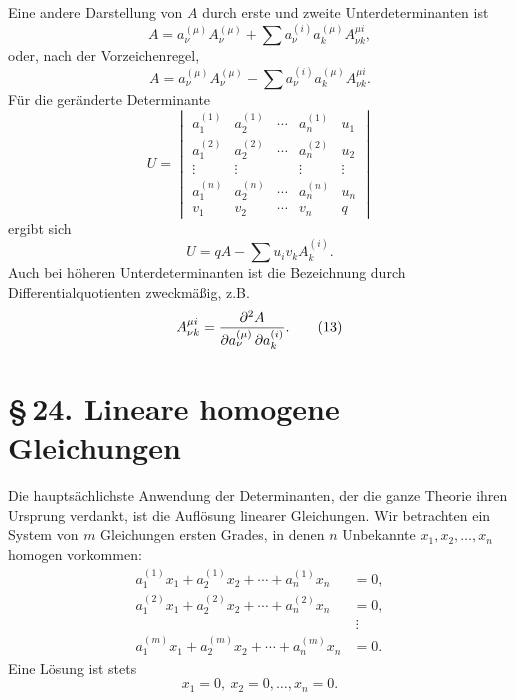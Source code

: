 \documentclass[11pt]{article}
\begin{document}
Eine andere Darstellung von \(A\) durch erste und zweite Unterdeterminanten ist
\begin{equation}
        A=a_\nu^{(\mu)}A_\nu^{(\mu)}+
        \sum a_\nu^{(i)}a_k^{(\mu)}A_{\nu k}^{\mu i},
\tag{9}
\end{equation}
oder, nach der Vorzeichenregel,
\begin{equation}
        A=a_\nu^{(\mu)}A_\nu^{(\mu)}-
        \sum a_\nu^{(i)}a_k^{(\mu)}A_{\nu k}^{\mu i}.
\tag{10}
\end{equation}
Für die geränderte Determinante
\begin{equation}
        U=\begin{vmatrix}
        a_1^{(1)}&a_2^{(1)}&\cdots&a_n^{(1)}&u_1\\
        a_1^{(2)}&a_2^{(2)}&\cdots&a_n^{(2)}&u_2\\
        \vdots&\vdots&&\vdots&\vdots\\
        a_1^{(n)}&a_2^{(n)}&\cdots&a_n^{(n)}&u_n\\
        v_1&v_2&\cdots&v_n&q
        \end{vmatrix}
\tag{11}
\end{equation}
ergibt sich
\begin{equation}
        U=qA-\sum u_i v_k A_k^{(i)}.
\tag{12}
\end{equation}
Auch bei höheren Unterdeterminanten ist die Bezeichnung durch Differentialquotienten zweckmäßig, z.B.
\begin{equation}
        A_{\nu k}^{\mu i}=
        {\partial^2 A\over \partial a_\nu^{(\mu)}\,\partial a_k^{(i)}} .
\tag{13}
\end{equation}

\section*{\S\,24. Lineare homogene Gleichungen}

Die hauptsächlichste Anwendung der Determinanten, der die ganze Theorie ihren Ursprung verdankt, ist die Auflösung linearer Gleichungen.  Wir betrachten ein System von \(m\) Gleichungen ersten Grades, in denen \(n\) Unbekannte \(x_1,x_2,
\ldots,x_n\) homogen vorkommen:
\begin{equation}
\begin{aligned}
 a_1^{(1)}x_1+a_2^{(1)}x_2+\cdots+a_n^{(1)}x_n&=0,\\
 a_1^{(2)}x_1+a_2^{(2)}x_2+\cdots+a_n^{(2)}x_n&=0,\\
 &\ \vdots\\
 a_1^{(m)}x_1+a_2^{(m)}x_2+\cdots+a_n^{(m)}x_n&=0.
\end{aligned}
\tag{1}
\end{equation}
Eine Lösung ist stets
\begin{equation}
        x_1=0,\ x_2=0,\ldots,x_n=0.
\tag{2}
\end{equation}
\end{document}
